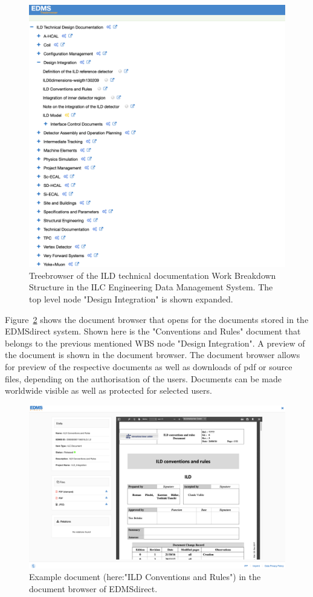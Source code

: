 \begin{figure}[t!]

\includegraphics[width=0.8\hsize]{Integration/fig/EDMS_direct.png}

\caption{\label{ild:fig:integration:edmsdirect}Treebrowser of the ILD technical documentation Work Breakdown Structure in the ILC Engineering Data Management System. The top level node "Design Integration" is shown expanded.}
\end{figure}

Figure~\ref{ild:fig:integration:edmsdirect_document} shows the document browser that opens for the documents stored in the EDMSdirect system. Shown here is the "Conventions and Rules" document that belongs to the previous mentioned WBS node "Design Integration". A preview of the document is shown in the document browser. The document browser allows for preview of the respective documents as well as downloads of pdf or source files, depending on the authorisation of the users. Documents can be made worldwide visible as well as protected for selected users.

\begin{figure}[t!]

\includegraphics[width=0.8\hsize]{Integration/fig/EDMS_direct_document.png}

\caption{\label{ild:fig:integration:edmsdirect_document}Example document (here:"ILD Conventions and Rules") in the document browser of EDMSdirect.}
\end{figure}

